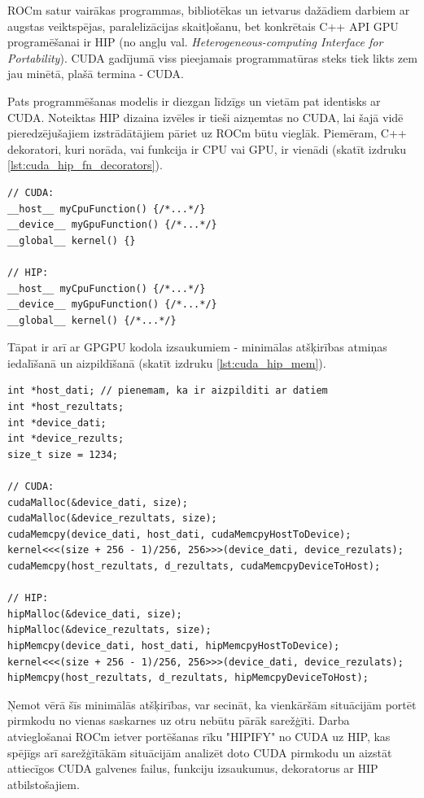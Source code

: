 ROCm satur vairākas programmas, bibliotēkas un ietvarus dažādiem darbiem ar
augstas veiktspējas, paralelizācijas skaitļošanu, bet konkrētais C++ API 
GPU programēšanai ir HIP (no angļu val. \textit{Heterogeneous-computing
Interface for Portability}).\cite{HIP_docs} CUDA gadījumā viss pieejamais
programmatūras steks tiek likts zem jau minētā, plašā termina - CUDA.

Pats programmēšanas modelis ir diezgan līdzīgs un vietām pat identisks ar
CUDA. Noteiktas HIP dizaina izvēles ir tieši aizņemtas no CUDA, lai šajā vidē
pieredzējušajiem izstrādātājiem pāriet uz ROCm būtu vieglāk. Piemēram, C++
dekoratori, kuri norāda, vai funkcija ir CPU vai GPU, ir vienādi (skatīt 
izdruku \ref{lst:cuda_hip_fn_decorators}).

\begin{lstlisting}[caption={CUDA un HIP funkciju definīciju salīdzinājums},
  label=lst:cuda_hip_fn_decorators,
  captionpos=b
]
// CUDA:
__host__ myCpuFunction() {/*...*/}
__device__ myGpuFunction() {/*...*/}
__global__ kernel() {}

// HIP:
__host__ myCpuFunction() {/*...*/}
__device__ myGpuFunction() {/*...*/}
__global__ kernel() {/*...*/}
\end{lstlisting}

Tāpat ir arī ar GPGPU kodola izsaukumiem - minimālas atšķirības atmiņas
iedalīšanā un aizpildīšanā (skatīt izdruku \ref{lst:cuda_hip_mem}).

\begin{lstlisting}[caption={CUDA un HIP kodola darbināšanas, atmiņas API
    izsaukumu salīdzinājums},
  label=lst:cuda_hip_mem,
  captionpos=b
]
int *host_dati; // pienemam, ka ir aizpilditi ar datiem
int *host_rezultats;
int *device_dati;
int *device_rezults;
size_t size = 1234;

// CUDA:
cudaMalloc(&device_dati, size);
cudaMalloc(&device_rezultats, size);
cudaMemcpy(device_dati, host_dati, cudaMemcpyHostToDevice);
kernel<<<(size + 256 - 1)/256, 256>>>(device_dati, device_rezulats);
cudaMemcpy(host_rezultats, d_rezultats, cudaMemcpyDeviceToHost);

// HIP:
hipMalloc(&device_dati, size);
hipMalloc(&device_rezultats, size);
hipMemcpy(device_dati, host_dati, hipMemcpyHostToDevice);
kernel<<<(size + 256 - 1)/256, 256>>>(device_dati, device_rezulats);
hipMemcpy(host_rezultats, d_rezultats, hipMemcpyDeviceToHost);
\end{lstlisting}

Ņemot vērā šīs minimālās atšķirības, var secināt, ka vienkāršām situācijām
portēt pirmkodu no vienas saskarnes uz otru nebūtu pārāk sarežģīti. Darba
atvieglošanai ROCm ietver portēšanas rīku "HIPIFY"  \cite{HIPIFY_github} no
CUDA uz HIP, kas spējīgs arī sarežģītākām situācijām analizēt doto CUDA
pirmkodu un aizstāt attiecīgos CUDA galvenes failus, funkciju izsaukumus,
dekoratorus ar HIP atbilstošajiem.

